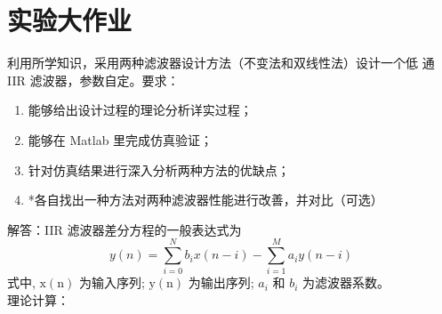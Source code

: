 \documentclass{seuer}
\begin{document}
\section{实验大作业}
利用所学知识，采用两种滤波器设计方法（不变法和双线性法）设计一个低
通 IIR 滤波器，参数自定。要求：
\begin{enumerate}
	\item 能够给出设计过程的理论分析详实过程；
	\item 能够在 Matlab 里完成仿真验证；
	\item 针对仿真结果进行深入分析两种方法的优缺点；
	\item *各自找出一种方法对两种滤波器性能进行改善，并对比（可选）
\end{enumerate}
解答：IIR 滤波器差分方程的一般表达式为
$$
y(n)=\sum_{i=0}^N b_i x(n-i)-\sum_{i=1}^M a_i y(n-i)
$$
式中, $\mathrm{x}(\mathrm{n})$ 为输入序列; $\mathrm{y}(\mathrm{n})$ 为输出序列; $a_i$ 和 $b_i$ 为滤波器系数。
\\理论计算：
\end{document}
